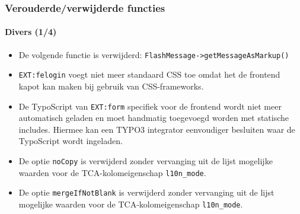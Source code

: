 \begin{frame}[fragile]
	\frametitle{Verouderde/verwijderde functies}
	\framesubtitle{Divers (1/4)}


	\begin{itemize}
		\item De volgende functie is verwijderd:\newline
			\small\texttt{FlashMessage->getMessageAsMarkup()}\normalsize
		\item \texttt{EXT:felogin} voegt niet meer standaard CSS toe omdat het de
			frontend kapot kan maken bij gebruik van CSS-frameworks.
		\item De TypoScript van \texttt{EXT:form} specifiek voor de frontend wordt niet meer
		 	automatisch geladen en moet handmatig toegevoegd worden met statische includes.
			Hiermee kan een TYPO3 integrator eenvoudiger besluiten waar de TypoScript wordt ingeladen.
		\item De optie \texttt{noCopy} is verwijderd zonder vervanging uit de lijst mogelijke waarden
			voor de TCA-kolomeigenschap \texttt{l10n\_mode}.
		\item De optie \texttt{mergeIfNotBlank} is verwijderd zonder vervanging uit de lijst mogelijke
			waarden voor de TCA-kolomeigenschap \texttt{l10n\_mode}.

	\end{itemize}

\end{frame}



